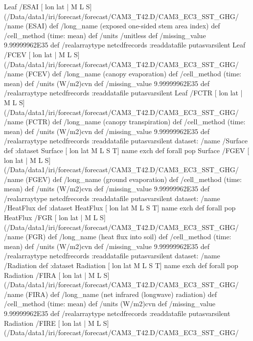 \begin{ingrid}
Leaf /ESAI{
[ lon lat | M L S] (/Data/data1/iri/forecast/forecast/CAM3_T42.D/CAM3_EC3_SST_GHG/%
/name (ESAI) def
 /long_name (exposed one-sided stem area index) def
 /cell_method (time: mean) def
 /units /unitless def
 /missing_value 9.99999962E35 def
 /realarraytype netcdfrecords :readdatafile
}putasvarsilent
Leaf /FCEV{
[ lon lat | M L S] (/Data/data1/iri/forecast/forecast/CAM3_T42.D/CAM3_EC3_SST_GHG/%
/name (FCEV) def
 /long_name (canopy evaporation) def
 /cell_method (time: mean) def
 /units (W/m2)cvn def
 /missing_value 9.99999962E35 def
 /realarraytype netcdfrecords :readdatafile
}putasvarsilent
Leaf /FCTR{
[ lon lat | M L S] (/Data/data1/iri/forecast/forecast/CAM3_T42.D/CAM3_EC3_SST_GHG/%
/name (FCTR) def
 /long_name (canopy transpiration) def
 /cell_method (time: mean) def
 /units (W/m2)cvn def
 /missing_value 9.99999962E35 def
 /realarraytype netcdfrecords :readdatafile
}putasvarsilent
dataset: /name /Surface def :dataset
Surface [ lon lat M L S T] {name exch def} forall pop
Surface /FGEV{
[ lon lat | M L S] (/Data/data1/iri/forecast/forecast/CAM3_T42.D/CAM3_EC3_SST_GHG/%
/name (FGEV) def
 /long_name (ground evaporation) def
 /cell_method (time: mean) def
 /units (W/m2)cvn def
 /missing_value 9.99999962E35 def
 /realarraytype netcdfrecords :readdatafile
}putasvarsilent
dataset: /name /HeatFlux def :dataset
HeatFlux [ lon lat M L S T] {name exch def} forall pop
HeatFlux /FGR{
[ lon lat | M L S] (/Data/data1/iri/forecast/forecast/CAM3_T42.D/CAM3_EC3_SST_GHG/%
/name (FGR) def
 /long_name (heat flux into soil) def
 /cell_method (time: mean) def
 /units (W/m2)cvn def
 /missing_value 9.99999962E35 def
 /realarraytype netcdfrecords :readdatafile
}putasvarsilent
dataset: /name /Radiation def :dataset
Radiation [ lon lat M L S T] {name exch def} forall pop
Radiation /FIRA{
[ lon lat | M L S] (/Data/data1/iri/forecast/forecast/CAM3_T42.D/CAM3_EC3_SST_GHG/%
/name (FIRA) def
 /long_name (net infrared (longwave) radiation) def
 /cell_method (time: mean) def
 /units (W/m2)cvn def
 /missing_value 9.99999962E35 def
 /realarraytype netcdfrecords :readdatafile
}putasvarsilent
Radiation /FIRE{
[ lon lat | M L S] (/Data/data1/iri/forecast/forecast/CAM3_T42.D/CAM3_EC3_SST_GHG/%
}
\end{ingrid}
